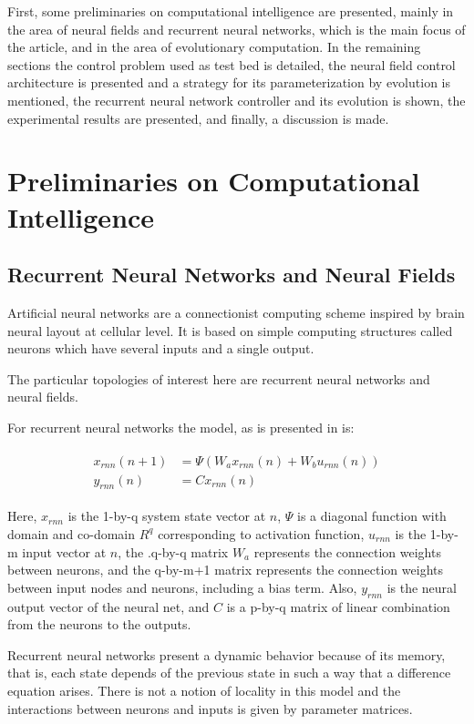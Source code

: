 \documentclass{sig-alternate}
\begin{document}
First, some preliminaries on computational intelligence are presented,
mainly in the area of neural fields and recurrent neural networks,
which is the main focus of the article, and in the area of
evolutionary computation. In the remaining sections the control
problem used as test bed is detailed, the neural field control
architecture is presented and a strategy for its parameterization by
evolution is mentioned, the recurrent neural network controller and
its evolution is shown, the experimental results are presented, and
finally, a discussion is made.


\section{Preliminaries on Computational Intelligence}
\subsection*{Recurrent Neural Networks and Neural Fields}
Artificial neural networks are a connectionist computing scheme
inspired by brain neural layout at cellular level. It is based on
simple computing structures called neurons which have several inputs
and a single output.

The particular topologies of interest here are recurrent neural
networks and neural fields.

For recurrent neural networks the model, as is presented in
\cite{Haykin98Neural} is:

\begin{align}
  \begin{split}
    x_{rnn}(n+1)&=\Psi (W_ax_{rnn}(n)+W_bu_{rnn}(n)) \\
    y_{rnn}(n)&=Cx_{rnn}(n)
  \end{split}
\end{align}

Here, $x_{rnn}$ is the 1-by-q system state vector at $n$, $\Psi$ is a
diagonal function with domain and co-domain $R^q$ corresponding to
activation function, $u_{rnn}$ is the 1-by-m input vector at $n$, the
.q-by-q matrix $W_a$ represents the connection weights between
neurons, and the q-by-m+1 matrix represents the connection weights
between input nodes and neurons, including a bias term. Also,
$y_{rnn}$ is the neural output vector of the neural net, and $C$ is a
p-by-q matrix of linear combination from the neurons to the outputs.

Recurrent neural networks present a dynamic behavior because of its
memory, that is, each state depends of the previous state in such a
way that a difference equation arises. There is not a notion of
locality in this model and the interactions between neurons and inputs
is given by parameter matrices.
\end{document}
